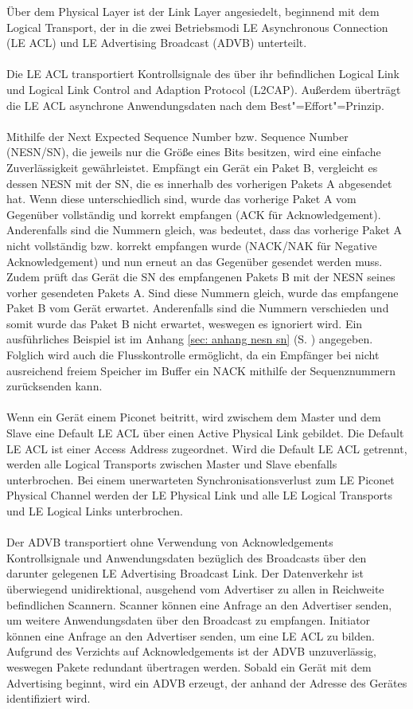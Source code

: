 Über dem Physical Layer ist der Link Layer angesiedelt, beginnend mit dem Logical Transport, der in die zwei Betriebsmodi LE Asynchronous Connection (LE ACL) und LE Advertising Broadcast (ADVB) unterteilt.
\\\\
Die LE ACL transportiert Kontrollsignale des über ihr befindlichen Logical Link und Logical Link Control and Adaption Protocol (L2CAP). Außerdem überträgt die LE ACL asynchrone Anwendungsdaten nach dem Best"=Effort"=Prinzip.
\\\\
Mithilfe der Next Expected Sequence Number bzw. Sequence Number (NESN/SN), die jeweils nur die Größe eines Bits besitzen, wird eine einfache Zuverlässigkeit gewährleistet. Empfängt ein Gerät ein Paket B, vergleicht es dessen NESN mit der SN, die es innerhalb des vorherigen Pakets A abgesendet hat. Wenn diese unterschiedlich sind, wurde das vorherige Paket A vom Gegenüber vollständig und korrekt empfangen (ACK für Acknowledgement). Anderenfalls sind die Nummern gleich, was bedeutet, dass das vorherige Paket A nicht vollständig bzw. korrekt empfangen wurde (NACK/NAK für Negative Acknowledgement) und nun erneut an das Gegenüber gesendet werden muss. Zudem prüft das Gerät die SN des empfangenen Pakets B mit der NESN seines vorher gesendeten Pakets A. Sind diese Nummern gleich, wurde das empfangene Paket B vom Gerät erwartet. Anderenfalls sind die Nummern verschieden und somit wurde das Paket B nicht erwartet, weswegen es ignoriert wird. Ein ausführliches Beispiel ist im Anhang \ref{sec: anhang nesn sn} (S. \pageref{sec: anhang nesn sn}) angegeben. Folglich wird auch die Flusskontrolle ermöglicht, da ein Empfänger bei nicht ausreichend freiem Speicher im Buffer ein NACK mithilfe der Sequenznummern zurücksenden kann. \cite{BtSpec4.0_2239-2241}
\\\\
Wenn ein Gerät einem Piconet beitritt, wird zwischem dem Master und dem Slave eine Default LE ACL über einen Active Physical Link gebildet. Die Default LE ACL ist einer Access Address zugeordnet. Wird die Default LE ACL getrennt, werden alle Logical Transports zwischen Master und Slave ebenfalls unterbrochen. Bei einem unerwarteten Synchronisationsverlust zum LE Piconet Physical Channel werden der LE Physical Link und alle LE Logical Transports und LE Logical Links unterbrochen.
\\\\
Der ADVB transportiert ohne Verwendung von Acknowledgements Kontrollsignale und Anwendungsdaten bezüglich des Broadcasts über den darunter gelegenen LE Advertising Broadcast Link. Der Datenverkehr ist überwiegend unidirektional, ausgehend vom Advertiser zu allen in Reichweite befindlichen Scannern. Scanner können eine Anfrage an den Advertiser senden, um weitere Anwendungsdaten über den Broadcast zu empfangen. Initiator können eine Anfrage an den Advertiser senden, um eine LE ACL zu bilden. Aufgrund des Verzichts auf Acknowledgements ist der ADVB unzuverlässig, weswegen Pakete redundant übertragen werden. Sobald ein Gerät mit dem Advertising beginnt, wird ein ADVB erzeugt, der anhand der Adresse des Gerätes identifiziert wird. \cite{BtSpec4.0_174-175}
